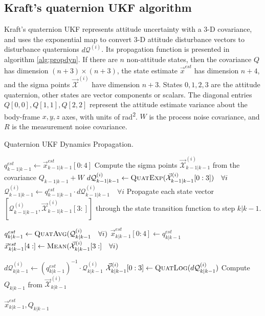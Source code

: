 \documentclass[conference]{IEEEtran}
\begin{document}
\subsection{Kraft's quaternion UKF algorithm}
Kraft's quaternion UKF \cite{1257247} represents attitude uncertainty with a 3-D covariance, and uses the exponential map to convert 3-D attitude disturbance vectors to disturbance quaternions $d\mathcal{Q}^{(i)}$. Its propagation function is presented in algorithm \ref{alg:propdyn}. If there are $n$ non-attitude states, then the covariance $Q$ has dimension $(n+3) \times (n+3)$, the state estimate $\vec{x}^{est}$ has dimension $n+4$, and the sigma points $\vec{\mathcal{X}}^{(i)}$ have dimension $n+3$. States $0, 1, 2, 3$ are the attitude quaternion, other states are vector components or scalars. The diagonal entries $Q[0,0], Q[1,1], Q[2,2]$ represent the attitude estimate variance about the body-frame $x,y,z$ axes, with units of \si{\radian\squared}. $W$ is the process noise covariance, and $R$ is the measurement noise covariance.\\

\begin{algorithm}
  \caption{Quaternion UKF Dynamics Propagation.}
  \label{alg:propdyn}
  \begin{algorithmic}
      \State $q_{k-1|k-1}^{est} \gets \vec{x}_{k-1|k-1}^{est}[0:4]$
      \State Compute the sigma points $\vec{\mathcal{X}}^{(i)}_{k-1|k-1}$ from the covariance $Q_{k-1|k-1} + W$
      \State $d\mathcal{Q}^{(i)}_{k-1|k-1} \gets \textproc{QuatExp}(\vec{\mathcal{X}}^{(i)}_{k-1|k-1}[0:3]) \quad \forall i$
      \State $\mathcal{Q}^{(i)}_{k-1|k-1} \gets q_{k-1|k-1}^{est} \cdot d\mathcal{Q}^{(i)}_{k-1|k-1} \quad \forall i$
      \State Propagate each state vector $[\mathcal{Q}^{(i)}_{k-1|k-1}, \vec{\mathcal{X}}^{(i)}_{k-1|k-1}[3:]]$ through the state transition function to step $k|k-1$.

      \State $q_{k|k-1}^{est} \gets \textproc{QuatAvg}(\mathcal{Q}^{(i)}_{k|k-1} \quad \forall i)$
      \State $\vec{x}_{k|k-1}^{est}[0:4] \gets q_{k|k-1}^{est}$
      \State $\vec{x}_{k|k-1}^{est}[4:] \gets \textproc{Mean}(\vec{\mathcal{X}}^{(i)}_{k|k-1}[3:] \quad \forall i)$

      \State $d\mathcal{Q}^{(i)}_{k|k-1} \gets (q_{k|k-1}^{est})^{-1} \cdot \mathcal{Q}^{(i)}_{k|k-1}$
      \State $\vec{\mathcal{X}}^{(i)}_{k|k-1}[0:3] \gets \textproc{QuatLog}(d\mathcal{Q}^{(i)}_{k|k-1})$
      \State Compute $Q_{k|k-1}$ from $\vec{\mathcal{X}}^{(i)}_{k|k-1}$

      \Return $\vec{x}_{k|k-1}^{est}, Q_{k|k-1}$
      \EndFunction
  \end{algorithmic}
\end{algorithm}
\end{document}
